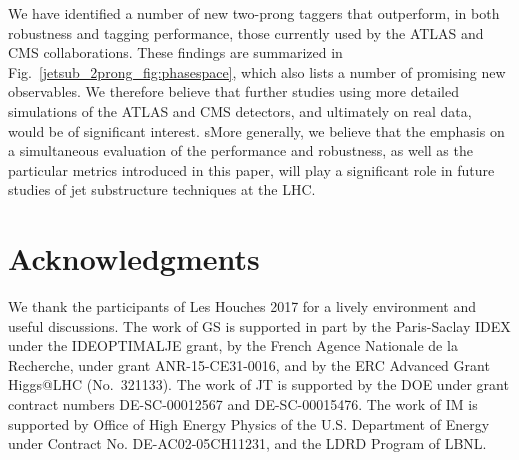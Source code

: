 \documentclass[11pt]{cernrep}
\begin{document}
We have identified a  number of new two-prong taggers that outperform, in both robustness and tagging performance, those currently used by the ATLAS and CMS collaborations.
%
These findings are summarized in Fig.~\ref{jetsub_2prong_fig:phasespace}, which also lists a number of promising new observables.
%
We therefore believe that further studies using more detailed simulations of the ATLAS and CMS detectors, and ultimately on real data, would be of significant interest.
%
sMore generally, we believe that the emphasis on a simultaneous evaluation of the performance and robustness, as well as the particular metrics introduced in this paper, will play a significant role in future studies of jet substructure techniques at the LHC.

\section{Acknowledgments}

We thank the participants of Les Houches 2017 for a lively environment and useful discussions. The work of GS is supported in part by the Paris-Saclay IDEX under the
IDEOPTIMALJE grant, by the French Agence Nationale de la Recherche,
under grant ANR-15-CE31-0016, and by the ERC Advanced Grant Higgs@LHC
(No.\ 321133).
%
The work of JT is supported by the DOE under grant contract numbers DE-SC-00012567 and DE-SC-00015476.
%
The work of IM is supported by Office of High Energy Physics of the U.S. Department of Energy under Contract No. DE-AC02-05CH11231, and the LDRD Program of LBNL.






\end{document}
